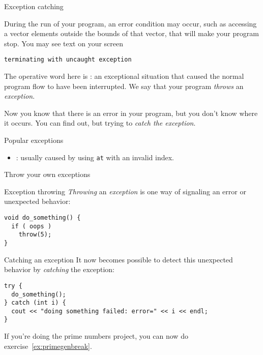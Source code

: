  {Exception catching}

During the run of your program, an error condition may occur,
such as accessing a vector elements outside the bounds of that vector,
that will make your program stop.
You may see text on your screen
\begin{verbatim}
terminating with uncaught exception
\end{verbatim}
The operative word here is :
an exceptional situation that caused the normal program flow
to have been interrupted. We say that your program
\emph{throws} an \emph{exception}.


Now you know that there is an error in your program, but
you don't know where it occurs.
You can find out, but trying to
\emph{catch the exception}.


 {Popular exceptions}

\begin{itemize}
\item {}: usually caused by using \lstinline{at}
  with an invalid index.
\end{itemize}

 {Throw your own exceptions}
\label{sec:except-throw}

\begin{block}{Exception throwing}
  \label{sl:exception-throw}
  \emph{Throwing} an \emph{exception} is one way of signaling an error or
  unexpected behavior:
\begin{lstlisting}
void do_something() {
  if ( oops )
    throw(5);
}
\end{lstlisting}
\end{block}

\begin{block}{Catching an exception}
  \label{sl:exception-catch}
  It now becomes possible to detect this unexpected behavior by
  \emph{catching}
  the exception:
\begin{lstlisting}
try {
  do_something();
} catch (int i) {
  cout << "doing something failed: error=" << i << endl;
}
\end{lstlisting}
\end{block}

If you're doing the prime numbers project, you can now
do exercise~\ref{ex:primegenbreak}.

